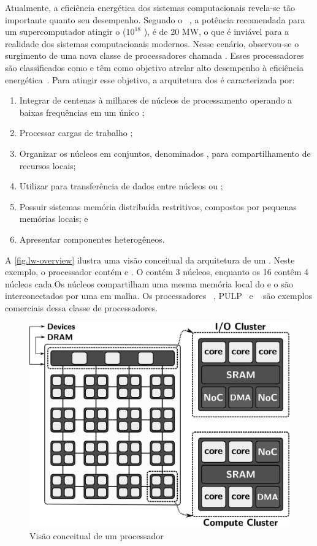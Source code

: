 Atualmente, a eficiência energética dos sistemas computacionais revela-se tão importante quanto seu desempenho. Segundo o \darpa~\cite{darpa:exascale}, a potência recomendada para um supercomputador atingir o \exascale ($10^{18}$ \flops), é de 20 MW, o que é inviável para a realidade dos sistemas computacionais modernos. Nesse cenário, observou-se o surgimento de uma nova classe de processadores chamada \lw. Esses processadores são classificados como \mpsocs e têm como objetivo atrelar alto desempenho à eficiência energética~\cite{francesquini2015}. Para atingir esse objetivo, a arquitetura dos \lws é caracterizada por:
\begin{enumerate}[label=(\roman*)]
    \item Integrar de centenas à milhares de núcleos de processamento operando a baixas frequências em um único \chip;
    \item Processar cargas de trabalho \mimd;
    \item Organizar os núcleos em conjuntos, denominados \clusters, para compartilhamento de recursos locais;
    \item Utilizar \nocs para transferência de dados entre núcleos ou \clusters;
    \item Possuir sistemas memória distribuída restritivos, compostos por pequenas memórias locais; e
    \item Apresentar componentes heterogêneos.
\end{enumerate}
A \autoref{fig.lw-overview} ilustra uma visão conceitual da arquitetura de um \lw. Neste exemplo, o processador contém \ioclusters e \cclusters. O \iocluster contém 3 núcleos, enquanto os 16 \cclusters contêm 4 núcleos cada.Os núcleos compartilham uma mesma memória local do \cluster e o \clusters são interconectados por uma \noc em malha. Os processadores \mppa~\cite{dinechin:2013}, PULP~\cite{pulp} e \taihulight~\cite{fu2016sunway} são exemplos comerciais dessa classe de processadores.

\begin{figure}[t]
	\centering
	\includegraphics[width=0.5\linewidth]{content/images/lw-overview-gs.jpg}
	\caption{Visão conceitual de um processador \lw~\cite{penna2021inter}}
    \label{fig.lw-overview}
\end{figure}

